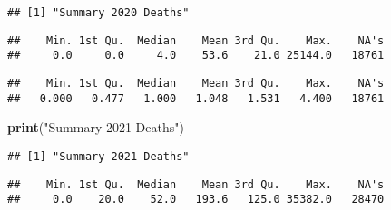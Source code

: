 \documentclass[
]{article}
\newenvironment{Shaded}{\begin{snugshade}}{\end{snugshade}}
\newcommand{\ConstantTok}[1]{\textcolor[rgb]{0.56,0.35,0.01}{#1}}
\newcommand{\FunctionTok}[1]{\textcolor[rgb]{0.13,0.29,0.53}{\textbf{#1}}}
\newcommand{\NormalTok}[1]{#1}
\newcommand{\SpecialCharTok}[1]{\textcolor[rgb]{0.81,0.36,0.00}{\textbf{#1}}}
\newcommand{\StringTok}[1]{\textcolor[rgb]{0.31,0.60,0.02}{#1}}
\begin{document}
\begin{verbatim}
## [1] "Summary 2020 Deaths"
\end{verbatim}

\begin{Shaded}
\end{Shaded}

\begin{verbatim}
##    Min. 1st Qu.  Median    Mean 3rd Qu.    Max.    NA's 
##     0.0     0.0     4.0    53.6    21.0 25144.0   18761
\end{verbatim}

\begin{Shaded}
\end{Shaded}

\begin{verbatim}
##    Min. 1st Qu.  Median    Mean 3rd Qu.    Max.    NA's 
##   0.000   0.477   1.000   1.048   1.531   4.400   18761
\end{verbatim}

\begin{Shaded}
\begin{Highlighting}[]
\FunctionTok{print}\NormalTok{(}\StringTok{"Summary 2021 Deaths"}\NormalTok{)}
\end{Highlighting}
\end{Shaded}

\begin{verbatim}
## [1] "Summary 2021 Deaths"
\end{verbatim}

\begin{Shaded}
\end{Shaded}

\begin{verbatim}
##    Min. 1st Qu.  Median    Mean 3rd Qu.    Max.    NA's 
##     0.0    20.0    52.0   193.6   125.0 35382.0   28470
\end{verbatim}
\end{document}
